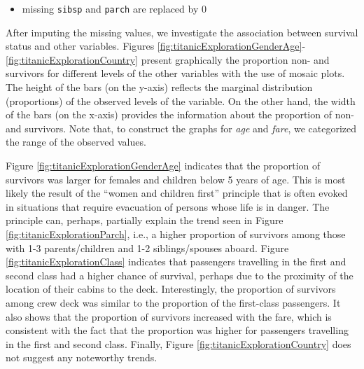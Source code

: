 \documentclass[12pt,]{krantz}
\newenvironment{Shaded}{\begin{snugshade}}{\end{snugshade}}
\newcommand{\DecValTok}[1]{\textcolor[rgb]{0.00,0.00,0.81}{#1}}
\newcommand{\KeywordTok}[1]{\textcolor[rgb]{0.13,0.29,0.53}{\textbf{#1}}}
\newcommand{\NormalTok}[1]{#1}
\newcommand{\OperatorTok}[1]{\textcolor[rgb]{0.81,0.36,0.00}{\textbf{#1}}}
\newcommand{\StringTok}[1]{\textcolor[rgb]{0.31,0.60,0.02}{#1}}
\providecommand{\tightlist}{%
  \setlength{\itemsep}{0pt}\setlength{\parskip}{0pt}}
\begin{document}
\begin{itemize}
\tightlist
\item
  missing \texttt{sibsp} and \texttt{parch} are replaced by 0
\end{itemize}

\begin{Shaded}
\end{Shaded}

After imputing the missing values, we investigate the association between survival status and other variables. Figures \ref{fig:titanicExplorationGenderAge}-\ref{fig:titanicExplorationCountry} present graphically the proportion non- and survivors for different levels of the other variables with the use of mosaic plots. The height of the bars (on the y-axis) reflects the marginal distribution (proportions) of the observed levels of the variable. On the other hand, the width of the bars (on the x-axis) provides the information about the proportion of non- and survivors. Note that, to construct the graphs for \emph{age} and \emph{fare}, we categorized the range of the observed values.

Figure \ref{fig:titanicExplorationGenderAge} indicates that the proportion of survivors was larger for females and children below 5 years of age. This is most likely the result of the ``women and children first'' principle that is often evoked in situations that require evacuation of persons whose life is in danger. The principle can, perhaps, partially explain the trend seen in Figure \ref{fig:titanicExplorationParch}, i.e., a higher proportion of survivors among those with 1-3 parents/children and 1-2 siblings/spouses aboard. Figure \ref{fig:titanicExplorationClass} indicates that passengers travelling in the first and second class had a higher chance of survival, perhaps due to the proximity of the location of their cabins to the deck. Interestingly, the proportion of survivors among crew deck was similar to the proportion of the first-class passengers. It also shows that the proportion of survivors increased with the fare, which is consistent with the fact that the proportion was higher for passengers travelling in the first and second class. Finally, Figure \ref{fig:titanicExplorationCountry} does not suggest any noteworthy trends.
\end{document}
